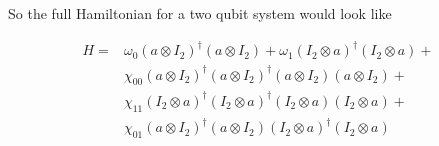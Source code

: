 \documentclass{article}
\begin{document}
So the full Hamiltonian for a two qubit system would look like 

$$
\begin{array}{ll}
H = & \omega_0 (a \otimes I_2)^{\dagger} (a \otimes I_2) + \omega_1 (I_2 \otimes a)^{\dagger} (I_2 \otimes a)  +\\
& \chi_{00} (a \otimes I_2)^{\dagger} (a \otimes I_2)^{\dagger} (a \otimes I_2) (a \otimes I_2) +\\
& \chi_{11}  (I_2 \otimes a)^{\dagger} (I_2 \otimes a)^{\dagger} (I_2 \otimes a) (I_2 \otimes a) +\\
& \chi_{01}  (a \otimes I_2)^{\dagger} (a \otimes I_2) (I_2 \otimes a)^{\dagger} (I_2 \otimes a) 
\end{array}\
$$
\end{document}
